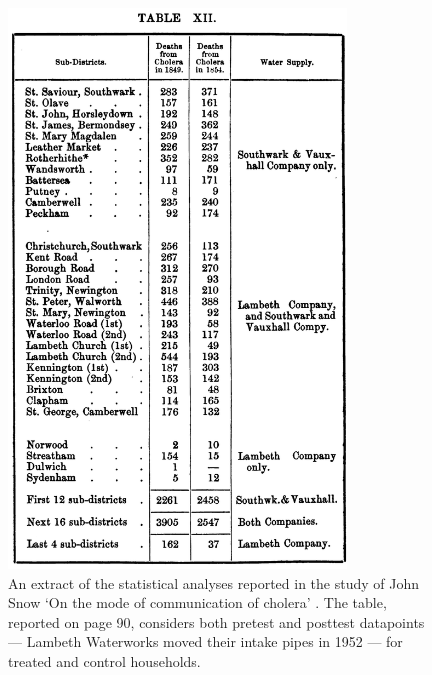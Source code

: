 \documentclass[11pt]{article}
\begin{document}
\begin{refsection}
\begin{figure}
  \begin{small}
    \begin{center}
      \includegraphics[width=0.8\textwidth]{exhibits/snow_natural_experiment.png}
    \end{center}
    \caption{An extract of the statistical analyses reported in the study of John 
    Snow `On the mode of communication of cholera' \autocite*{snow_1855}. The 
    table, reported on page 90, considers both pretest and posttest datapoints ---
    Lambeth Waterworks moved their intake pipes in 1952 --- for treated 
    and control households.}
    \label{fig:snow_natural_experiment}
  \end{small}
\end{figure}


\end{refsection}
\end{document}
